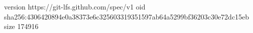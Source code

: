 version https://git-lfs.github.com/spec/v1
oid sha256:4306420894e0a38373e6c325603319351597ab64a5299bf36203c30e72dc15eb
size 174916

